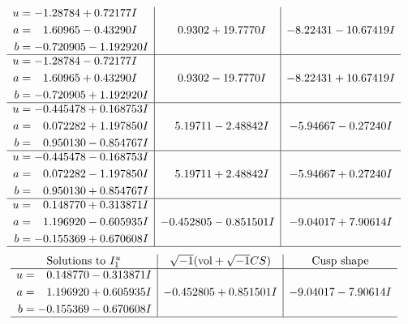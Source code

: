 \documentclass[1p]{elsarticle_modified}
\theoremstyle{definition}
\newcommand{\I}{\sqrt{-1}}
\begin{document}
$$\begin{array}{c|c|c}
\begin{aligned}
u &= -1.28784 + 0.72177 I \\
a &= \phantom{-}1.60965 - 0.43290 I \\
b &= -0.720905 - 1.192920 I\end{aligned}
 & \phantom{-}0.9302 + 19.7770 I & -8.22431 - 10.67419 I \\ \hline\begin{aligned}
u &= -1.28784 - 0.72177 I \\
a &= \phantom{-}1.60965 + 0.43290 I \\
b &= -0.720905 + 1.192920 I\end{aligned}
 & \phantom{-}0.9302 - 19.7770 I & -8.22431 + 10.67419 I \\ \hline\begin{aligned}
u &= -0.445478 + 0.168753 I \\
a &= \phantom{-}0.072282 + 1.197850 I \\
b &= \phantom{-}0.950130 - 0.854767 I\end{aligned}
 & \phantom{-}5.19711 - 2.48842 I & -5.94667 - 0.27240 I \\ \hline\begin{aligned}
u &= -0.445478 - 0.168753 I \\
a &= \phantom{-}0.072282 - 1.197850 I \\
b &= \phantom{-}0.950130 + 0.854767 I\end{aligned}
 & \phantom{-}5.19711 + 2.48842 I & -5.94667 + 0.27240 I \\ \hline\begin{aligned}
u &= \phantom{-}0.148770 + 0.313871 I \\
a &= \phantom{-}1.196920 - 0.605935 I \\
b &= -0.155369 + 0.670608 I\end{aligned}
 & -0.452805 - 0.851501 I & -9.04017 + 7.90614 I\\
 \hline 
 \end{array}$$\newpage$$\begin{array}{c|c|c}  
\text{Solutions to }I^u_{1}& \I (\text{vol} + \sqrt{-1}CS) & \text{Cusp shape}\\
 \hline 
\begin{aligned}
u &= \phantom{-}0.148770 - 0.313871 I \\
a &= \phantom{-}1.196920 + 0.605935 I \\
b &= -0.155369 - 0.670608 I\end{aligned}
 & -0.452805 + 0.851501 I & -9.04017 - 7.90614 I\\
 \hline 
 \end{array}$$\newpage\newpage\renewcommand{\arraystretch}{1}
\end{document}
